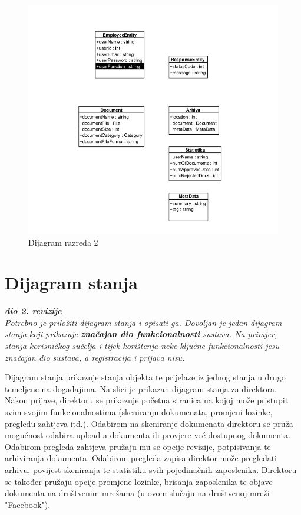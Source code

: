 			\begin{figure}[H]
				\includegraphics[scale=0.5]{slike/dijagram_razred2.jpeg} %
				\centering
				\caption{Dijagram razreda 2}
				\label{fig:promjene}
			\end{figure}
			
			
			
			\eject
		
		\iffalse
		\section{Dijagram stanja}
			
			
			\textbf{\textit{dio 2. revizije}}\\
			
			\textit{Potrebno je priložiti dijagram stanja i opisati ga. Dovoljan je jedan dijagram stanja koji prikazuje \textbf{značajan dio funkcionalnosti} sustava. Na primjer, stanja korisničkog sučelja i tijek korištenja neke ključne funkcionalnosti jesu značajan dio sustava, a registracija i prijava nisu. }
			
			Dijagram stanja prikazuje stanja objekta te prijelaze iz jednog stanja u drugo temeljene na dogadajima. Na slici je prikazan dijagram stanja za direktora. Nakon prijave, direktoru se prikazuje početna stranica na kojoj može pristupit svim svojim funkcionalnostima (skeniranju dokumenata, promjeni lozinke, pregledu zahtjeva itd.). Odabirom na skeniranje dokumenata direktoru se pruža mogućnost odabira upload-a dokumenta ili provjere već dostupnog dokumenta. Odabirom pregleda zahtjeva pružaju mu se opcije revizije, potpisivanja te arhiviranja dokumenta. Odabirom pregleda zapisa direktor može pregledati arhivu, povijest skeniranja te statistiku svih pojedinačnih zaposlenika. Direktoru se također pružaju opcije promjene lozinke, brisanja zaposlenika te objave dokumenta na društvenim mrežama (u ovom slučaju na društvenoj mreži "Facebook").
			
